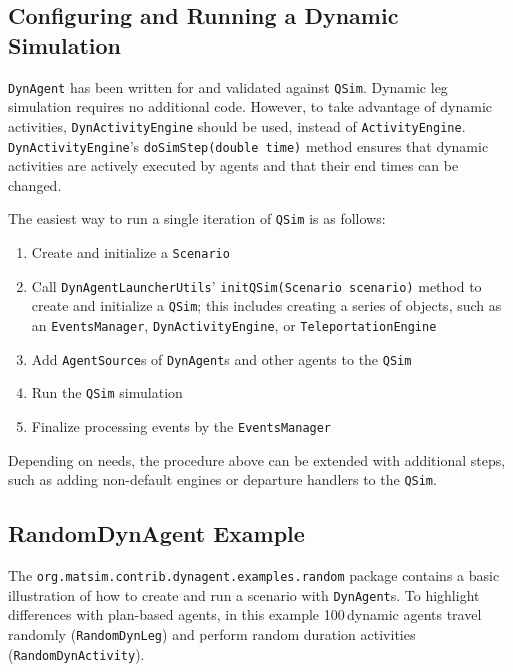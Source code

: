 \subsection{Configuring and Running a Dynamic Simulation}
\label{sec:config-dyn-sim}
\lstinline$DynAgent$ has been written for and validated against \lstinline$QSim$. Dynamic leg simulation requires no additional code. However, to take advantage of dynamic activities,  \lstinline$DynActivityEngine$ should be used, instead of \lstinline$ActivityEngine$. \lstinline$DynActivityEngine$'s \lstinline$doSimStep(double time)$ method ensures that dynamic activities are actively executed by agents and that their end times can be changed.

The easiest way to run a single iteration of \lstinline$QSim$ is as follows:
%
\begin{enumerate}\styleEnumerate
	\item Create and initialize a \lstinline$Scenario$

	\item Call \lstinline$DynAgentLauncherUtils$' \lstinline$initQSim(Scenario scenario)$ method to create and initialize a \lstinline$QSim$; this includes creating a series of objects, such as an \lstinline$EventsManager$, \lstinline$DynActivityEngine$, or \lstinline$TeleportationEngine$

	\item Add \lstinline$AgentSource$s of \lstinline$DynAgent$s and other agents to the \lstinline$QSim$
	
	\item Run the \lstinline$QSim$ simulation
	
	\item Finalize processing events by the \lstinline$EventsManager$
	
\end{enumerate}
%
Depending on needs, the procedure above can be extended with additional steps, such as adding non-default engines or departure handlers to the \lstinline$QSim$.

\subsection{RandomDynAgent Example}
The \lstinline$org.matsim.contrib.dynagent.examples.random$ package contains a basic illustration of how to create and run a scenario with \lstinline$DynAgent$s. To highlight differences with plan-based agents, in this example 100\,dynamic agents travel randomly (\lstinline$RandomDynLeg$) and perform random duration activities (\lstinline$RandomDynActivity$).

